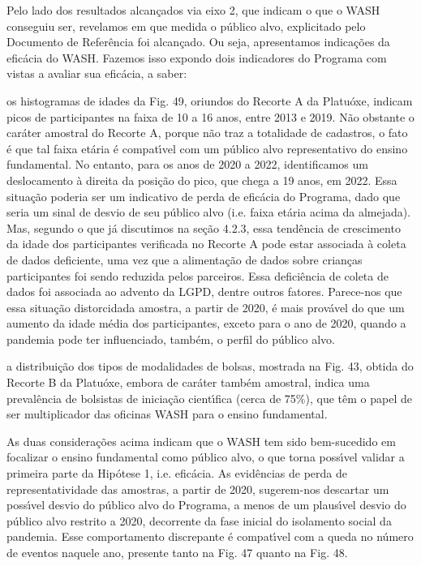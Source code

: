 \documentclass[
12pt,		%
openright,	%
twoside,  %
a4paper,			%
chapter=TITLE,		%
english,			%
french,				%
spanish,			%
brazil				%
]{USPSC-classe/USPSC}
\begin{document}
Pelo lado dos resultados alcan\c{c}ados via eixo 2, que indicam \textquotedbl o que o WASH conseguiu ser\textquotedbl , revelamos em que medida o p\'ublico alvo, explicitado pelo  Documento de Refer\^encia foi alcan\c{c}ado. Ou seja, apresentamos indica\c{c}\~oes da efic\'acia do WASH. Fazemos isso expondo dois indicadores do Programa com vistas a avaliar sua efic\'acia, a saber:










\begin{alineas}
\item os histogramas de idades da Fig. 49, oriundos do Recorte A da Platu\'oxe, indicam picos de participantes na faixa de 10 a 16 anos, entre  2013 e 2019. N\~ao obstante o car\'ater amostral do Recorte A, porque n\~ao traz a totalidade de cadastros, o fato \'e que tal faixa et\'aria \'e compat\'{\i}vel com um p\'ublico alvo representativo do ensino fundamental. No entanto, para os anos de 2020 a 2022, identificamos um deslocamento \`a direita da posi\c{c}\~ao do pico, que chega a 19 anos, em 2022. Essa situa\c{c}\~ao poderia ser um indicativo de perda de efic\'acia do Programa, dado que seria um sinal de desvio de seu p\'ublico alvo (i.e. faixa et\'aria acima da almejada). Mas, segundo o que j\'a discutimos na se\c{c}\~ao 4.2.3, essa tend\^encia de crescimento da idade dos participantes verificada no Recorte A pode estar associada \`a coleta de dados deficiente, uma vez que a alimenta\c{c}\~ao de dados sobre crian\c{c}as participantes foi sendo reduzida pelos parceiros. Essa defici\^encia de coleta de dados foi associada ao advento da LGPD, dentre outros fatores.  Parece-nos que essa situa\c{c}\~ao \textquotedbl distorcida\textquotedbl   da amostra, a partir de 2020, \'e  mais prov\'avel do que um aumento da idade m\'edia dos participantes, exceto para o ano de 2020, quando a pandemia pode ter influenciado, tamb\'em, o perfil do p\'ublico alvo.
\item a distribui\c{c}\~ao dos tipos de modalidades de bolsas, mostrada na Fig. 43, obtida do Recorte B da Platu\'oxe, embora de car\'ater tamb\'em amostral, indica uma preval\^encia de bolsistas de inicia\c{c}\~ao cient\'{\i}fica (cerca de 75\%), que t\^em o papel de ser  multiplicador das oficinas WASH para o ensino fundamental.
\end{alineas}

As duas considera\c{c}\~oes acima indicam que o WASH tem sido bem-sucedido em focalizar o ensino fundamental como p\'ublico alvo, o que torna poss\'{\i}vel validar a primeira parte da Hip\'otese 1, i.e. efic\'acia. As evid\^encias de perda de representatividade das amostras, a partir de 2020, sugerem-nos descartar um poss\'{\i}vel desvio do p\'ublico alvo do Programa, a menos de um plaus\'{\i}vel desvio do p\'ublico alvo restrito a 2020, decorrente da fase inicial do isolamento social da pandemia. Esse comportamento discrepante \'e compat\'{\i}vel com a queda no n\'umero de eventos naquele ano, presente tanto na Fig. 47 quanto na Fig. 48.
\end{document}
